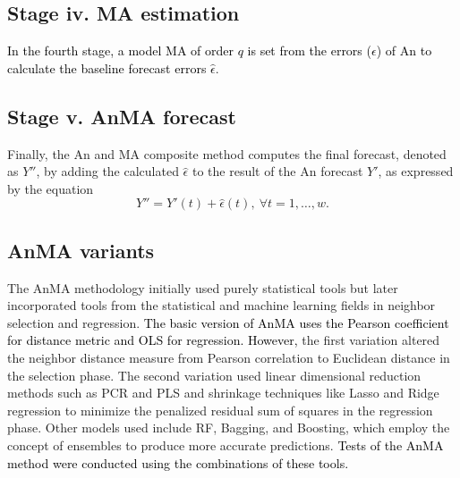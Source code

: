 \documentclass[journal, twoside]{IEEEtran}
\begin{document}
\subsection*{Stage iv. MA estimation}
\label{ma_estimation_method}
\textcolor{black}{In the fourth stage, a model MA of order $q$ is set from the errors ($\epsilon$) of An to calculate the baseline forecast errors $\hat{\epsilon}$}.

\subsection*{Stage v. AnMA forecast}
\label{anma_forecast}

Finally, the An and MA composite method computes the final forecast, denoted as $Y''$, by adding the calculated $\hat{\epsilon}$ to the result of the An forecast $Y'$, as expressed by the equation 
\begin{equation}
Y''= Y'(t) + \hat{\epsilon}(t), \ \forall t={1,\ldots,w}.
\end{equation}






\subsection{AnMA variants}

The \ac{AnMA} methodology initially used purely statistical tools but later incorporated tools from the statistical and machine learning fields in neighbor selection and regression. \textcolor{black}{The basic version of AnMA uses the Pearson coefficient for distance metric and {OLS} for regression. However, } the first variation altered the neighbor distance measure from Pearson correlation to Euclidean distance in the selection phase. The second variation used linear dimensional reduction methods such as \ac{PCR} and \ac{PLS} and shrinkage techniques like Lasso and Ridge regression to minimize the penalized residual sum of squares in the regression phase. Other models used include \ac{RF}, Bagging, and Boosting, which employ the concept of ensembles to produce more accurate predictions.
\textcolor{black}{Tests of the \ac{AnMA} method were conducted using the combinations of these tools.} %
\end{document}
